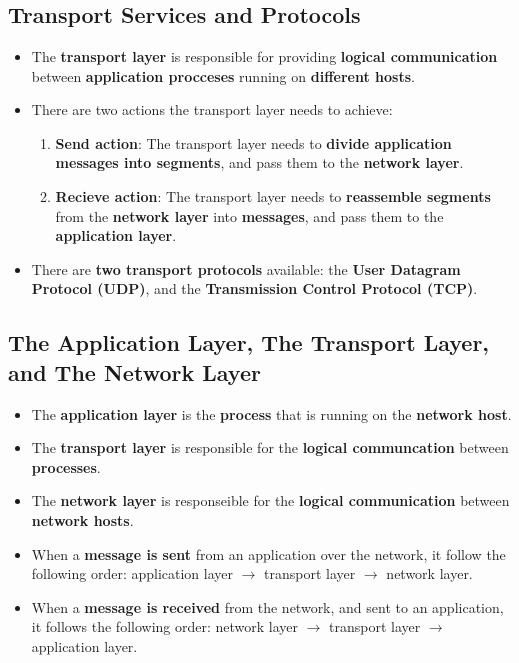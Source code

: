 \documentclass{article}
\begin{document}
    \section*{}

    \subsection*{Transport Services and Protocols}
    \begin{itemize}
        \item The \textbf{transport layer} is responsible for providing \textbf{logical communication} between \textbf{application procceses} running on \textbf{different hosts}.
        \item There are two actions the transport layer needs to achieve:
        \begin{enumerate}
            \item \textbf{Send action}: The transport layer needs to \textbf{divide application messages into segments}, and pass them to the \textbf{network layer}.
            \item \textbf{Recieve action}: The transport layer needs to \textbf{reassemble segments} from the \textbf{network layer} into \textbf{messages}, and pass them to the \textbf{application layer}.
        \end{enumerate}
        \item There are \textbf{two transport protocols} available: the \textbf{User Datagram Protocol (UDP)}, and the \textbf{Transmission Control Protocol (TCP)}.
    \end{itemize}

    \subsection*{The Application Layer, The Transport Layer, and The Network Layer}
    \begin{itemize}
        \item The \textbf{application layer} is the \textbf{process} that is running on the \textbf{network host}.
        \item The \textbf{transport layer} is responsible for the \textbf{logical communcation} between \textbf{processes}.
        \item The \textbf{network layer} is responseible for the \textbf{logical communication} between \textbf{network hosts}.
        \item When a \textbf{message is sent} from an application over the network, it follow the following order: application layer $\rightarrow$ transport layer $\rightarrow$ network layer.
        \item When a \textbf{message is received} from the network, and sent to an application, it follows the following order: network layer $\rightarrow$ transport layer $\rightarrow$ application layer.
    \end{itemize}
\end{document}
